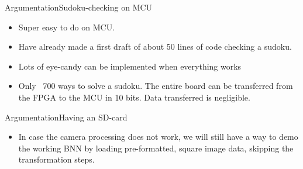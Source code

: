 \documentclass[10pt]{beamer}
\begin{document}
\begin{frame}{Argumentation}{Sudoku-checking on MCU}
\begin{itemize}
\item Super easy to do on MCU.
\item Have already made a first draft of about 50 lines of code checking a sudoku.
\item Lots of eye-candy can be implemented when everything works
\item Only ~700 ways to solve a sudoku. The entire board can be transferred from the FPGA to the MCU in 10 bits. Data transferred is negligible.
\end{itemize}
\end{frame}

\begin{frame}{Argumentation}{Having an SD-card}
\begin{itemize}
\item In case the camera processing does not work, we will still have a way to demo the working BNN by loading pre-formatted, square image data, skipping the transformation steps.
\end{itemize}
\end{frame}
\end{document}
